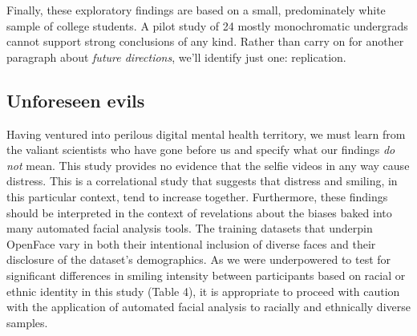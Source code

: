 \documentclass[authordate, empirical,issue]{jote-new-article}
\begin{document}
Finally, these exploratory findings are based on a small, predominately white sample of college students. A pilot study of 24 mostly monochromatic undergrads cannot support strong conclusions of any kind. Rather than carry on for another paragraph about \emph{future directions}, we'll identify just one: replication.







\subsection{Unforeseen evils}



Having ventured into perilous digital mental health territory, we must learn from the valiant scientists who have gone before us and specify what our findings \emph{do not} mean. This study provides no evidence that the selfie videos in any way cause distress. This is a correlational study that suggests that distress and smiling, in this particular context, tend to increase together. Furthermore, these findings should be interpreted in the context of revelations about the biases baked into many automated facial analysis tools. The training datasets that underpin OpenFace vary in both their intentional inclusion of diverse faces and their disclosure of the dataset's demographics. As we were underpowered to test for significant differences in smiling intensity between participants based on racial or ethnic identity in this study (Table 4), it is appropriate to proceed with caution with the application of automated facial analysis to racially and ethnically diverse samples.
\end{document}
